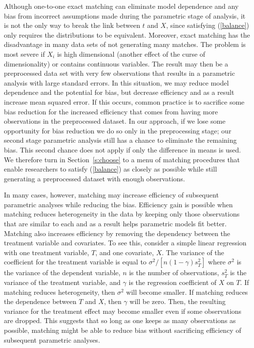 \documentclass[11pt,titlepage]{article}
\begin{document}
Although one-to-one exact matching can eliminate model dependence and
any bias from incorrect assumptions made during the parametric stage
of analysis, it is not the only way to break the link between $t$ and
$X$, since satisfying (\ref{balance}) only requires the distributions
to be equivalent.  Moreover, exact matching has the disadvantage in
many data sets of not generating many matches.  The problem is most
severe if $X_i$ is high dimensional (another effect of the curse of
dimensionality) or contains continuous variables.  The result may then
be a preprocessed data set with very few observations that results in
a parametric analysis with large standard errors.  In this situation,
we may reduce model dependence and the potential for bias, but
decrease efficiency and as a result increase mean squared error.  If
this occurs, common practice is to sacrifice some bias reduction for
the increased efficiency that comes from having more observations in
the preprocessed dataset.  In our approach, if we lose some
opportunity for bias reduction we do so only in the preprocessing
stage; our second stage parametric analysis still has a chance to
eliminate the remaining bias.  This second chance does not apply if
only the difference in means is used.  We therefore turn in
Section~\ref{s:choose} to a menu of matching procedures that enable
researchers to satisfy (\ref{balance}) as closely as possible while
still generating a preprocessed dataset with enough observations.

In many cases, however, matching may increase efficiency of subsequent
parametric analyses while reducing the bias. Efficiency gain is
possible when matching reduces heterogeneity in the data by keeping
only those observations that are similar to each and as a result helps
parametric models fit better. Matching also increases efficiency by
removing the dependency between the treatment variable and covariates.
To see this, consider a simple linear regression with one treatment
variable, $T$, and one covariate, $X$. The variance of the coefficient
for the treatment variable is equal to $\sigma^2/[n (1-\gamma) s^2_T]$
where $\sigma^2$ is the variance of the dependent variable, $n$ is the
number of observations, $s^2_T$ is the variance of the treatment
variable, and $\gamma$ is the regression coefficient of $X$ on $T$. If
matching reduces heterogeneity, then $\sigma^2$ will become smaller.
If matching reduces the dependence between $T$ and $X$, then $\gamma$
will be zero. Then, the resulting variance for the treatment effect
may become smaller even if some observations are dropped. This
suggests that so long as one keeps as many observations as possible,
matching might be able to reduce bias without sacrificing efficiency
of subsequent parametric analyses.
\end{document}
